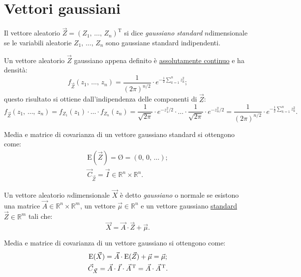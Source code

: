     \section{Vettori gaussiani}
        \begin{defn}\label{defn:Vettore_gaussiano_standard}
            Il vettore aleatorio $\vec{Z} = (Z_1,\, \ldots,\, Z_{n})^{\text{T}}$ si dice \textit{gaussiano standard} $n$\nbdash dimensionale se le variabili aleatorie $Z_1,\, \ldots,\, Z_{n}$ sono gaussiane standard indipendenti.

            Un vettore aleatorio $\vec{Z}$ gaussiano appena definito è \underline{assolutamente continuo} e ha densità: \[
                f_{\vec{Z}}(z_1,\, \ldots,\, z_{n}) = \frac{1}{(2\pi)^{n /2}} \cdot e^{-\frac{1}{2}\sum_{k=1}^{n} z_k^2}
            ;\] questo risultato si ottiene dall'indipendenza delle componenti di $\vec{Z}$: \[
            f_{\vec{Z}}(z_1,\, \ldots,\, z_{n}) = f_{Z_1}(z_1) \cdot \ldots \cdot f_{Z_n}(z_n) =
            \frac{1}{\sqrt{2\pi}} \cdot e^{- z_1^2 /2} \cdot \ldots \cdot \frac{1}{\sqrt{2\pi}} \cdot e^{- z_n^2 /2} = \frac{1}{(2\pi)^{n /2}} \cdot e^{-\frac{1}{2}\sum_{k=1}^{n} z_k^2}
            .\] 
        \end{defn}
        \begin{obsv}
            Media e matrice di covarianza di un vettore gaussiano standard si ottengono come:
            \begin{gather*}
                \text{E}(\vec{Z}) = \text{\O} = (0,\,0,\,\ldots); \\
                \vec{C}_{\vec{Z}} = \vec{I} \in \mathbb{R}^n \times \mathbb{R}^n.
            \end{gather*}
        \end{obsv}
        \begin{defn}[Normale]\label{defn:Vettore_gaussiano}
            Un vettore aleatorio $n$\nbdash dimensionale $\vec{X}$ è detto \textit{gaussiano} o normale se esistono una matrice $\vec{A} \in \mathbb{R}^n \times \mathbb{R}^m$, un vettore $\vec{\mu} \in \mathbb{R}^n$ e un vettore gaussiano \underline{standard} $\vec{Z} \in \mathbb{R}^m$ tali che: \[
            \vec{X} = \vec{A} \cdot \vec{Z} + \vec{\mu}
            .\] 
        \end{defn}
        \begin{obsv}\label{obsv:Vettore_gaussiano}
            Media e matrice di covarianza di un vettore gaussiano si ottengono come:
            \begin{gather*}
                \text{E}(\vec{X}) = \vec{A} \cdot \text{E}(\vec{Z}) + \vec{\mu} = \vec{\mu}; \\
                \vec{C}_{\vec{X}} = \vec{A} \cdot \vec{I} \cdot \vec{A}^{\text{\,T}} = \vec{A} \cdot \vec{A}^{\text{\,T}}.
            \end{gather*}
        \end{obsv}
